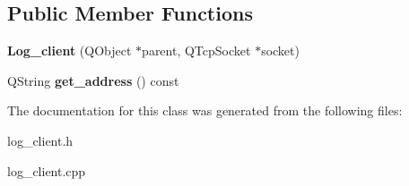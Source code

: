 \subsection*{Public Member Functions}
\begin{DoxyCompactItemize}
\item 
\hypertarget{class_log__viewer_1_1_log__client_a9acd4a9779abbe1e8d7c901957d25e08}{{\bfseries Log\-\_\-client} (Q\-Object $\ast$parent, Q\-Tcp\-Socket $\ast$socket)}\label{class_log__viewer_1_1_log__client_a9acd4a9779abbe1e8d7c901957d25e08}

\item 
\hypertarget{class_log__viewer_1_1_log__client_a4c6e877bda0d4797c4a8f828f4aba7e2}{Q\-String {\bfseries get\-\_\-address} () const }\label{class_log__viewer_1_1_log__client_a4c6e877bda0d4797c4a8f828f4aba7e2}

\end{DoxyCompactItemize}


The documentation for this class was generated from the following files\-:\begin{DoxyCompactItemize}
\item 
log\-\_\-client.\-h\item 
log\-\_\-client.\-cpp\end{DoxyCompactItemize}
